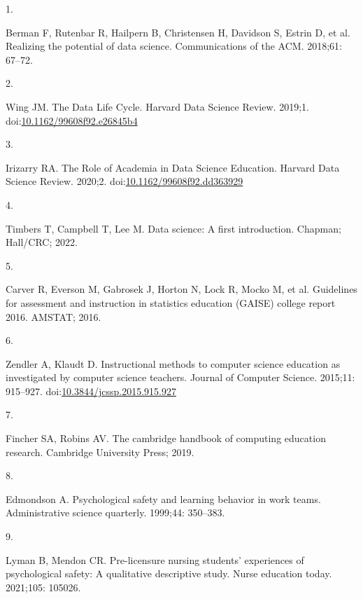 \documentclass[
  10pt,
  letterpaper,
]{article}
\newlength{\cslhangindent}
\newlength{\csllabelwidth}
\newenvironment{CSLReferences}[2] %
 {\begin{list}{}{%
  \setlength{\itemindent}{0pt}
  \setlength{\leftmargin}{0pt}
  \setlength{\parsep}{0pt}
  \ifodd #1
   \setlength{\leftmargin}{\cslhangindent}
   \setlength{\itemindent}{-1\cslhangindent}
  \fi
  \setlength{\itemsep}{#2\baselineskip}}}
 {\end{list}}
\newcommand{\CSLLeftMargin}[1]{\parbox[t]{\csllabelwidth}{\strut#1\strut}}
\newcommand{\CSLRightInline}[1]{\parbox[t]{\linewidth - \csllabelwidth}{\strut#1\strut}}
\begin{document}
\label{refs}
\begin{CSLReferences}{0}{1}
\CSLLeftMargin{1. }%
\CSLRightInline{Berman F, Rutenbar R, Hailpern B, Christensen H,
Davidson S, Estrin D, et al. Realizing the potential of data science.
Communications of the ACM. 2018;61: 67--72. }

\CSLLeftMargin{2. }%
\CSLRightInline{Wing JM. The {Data} {Life} {Cycle}. Harvard Data Science
Review. 2019;1.
doi:\href{https://doi.org/10.1162/99608f92.e26845b4}{10.1162/99608f92.e26845b4}}

\CSLLeftMargin{3. }%
\CSLRightInline{Irizarry RA. {The Role of Academia in Data Science
Education}. Harvard Data Science Review. 2020;2.
doi:\href{https://doi.org/10.1162/99608f92.dd363929}{10.1162/99608f92.dd363929}}

\CSLLeftMargin{4. }%
\CSLRightInline{Timbers T, Campbell T, Lee M. Data science: A first
introduction. Chapman; Hall/CRC; 2022. }

\CSLLeftMargin{5. }%
\CSLRightInline{Carver R, Everson M, Gabrosek J, Horton N, Lock R, Mocko
M, et al. Guidelines for assessment and instruction in statistics
education (GAISE) college report 2016. AMSTAT; 2016. }

\CSLLeftMargin{6. }%
\CSLRightInline{Zendler A, Klaudt D. Instructional methods to computer
science education as investigated by computer science teachers. Journal
of Computer Science. 2015;11: 915--927.
doi:\href{https://doi.org/10.3844/jcssp.2015.915.927}{10.3844/jcssp.2015.915.927}}

\CSLLeftMargin{7. }%
\CSLRightInline{Fincher SA, Robins AV. The cambridge handbook of
computing education research. Cambridge University Press; 2019. }

\CSLLeftMargin{8. }%
\CSLRightInline{Edmondson A. Psychological safety and learning behavior
in work teams. Administrative science quarterly. 1999;44: 350--383. }

\CSLLeftMargin{9. }%
\CSLRightInline{Lyman B, Mendon CR. Pre-licensure nursing students'
experiences of psychological safety: A qualitative descriptive study.
Nurse education today. 2021;105: 105026. }


\end{CSLReferences}
\end{document}
